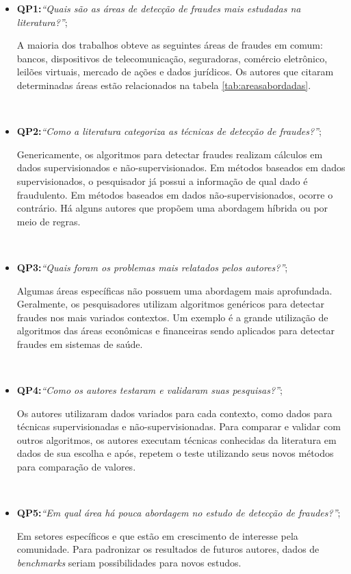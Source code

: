 \documentclass[smallextended]{svjour3}
\begin{document}
\begin{itemize}
	\item \textbf{QP1:}\textit{“Quais são as áreas de detecção de fraudes mais estudadas na literatura?”};
	
	A maioria dos trabalhos obteve as seguintes áreas de fraudes em comum: bancos, dispositivos de telecomunicação, seguradoras, comércio eletrônico, leilões virtuais, mercado de ações e dados jurídicos. Os autores que citaram determinadas áreas estão relacionados na tabela \ref{tab:areasabordadas}.
	
	\
	\item \textbf{QP2:}\textit{“Como a literatura categoriza as técnicas de detecção de fraudes?”};
	
	Genericamente, os algoritmos para detectar fraudes realizam cálculos em dados supervisionados e não-supervisionados. Em métodos baseados em dados supervisionados, o pesquisador já possui a informação de qual dado é fraudulento. Em métodos baseados em dados não-supervisionados, ocorre o contrário. Há alguns autores que propõem uma abordagem híbrida ou por meio de regras.
	
	\
	\item \textbf{QP3:}\textit{“Quais foram os problemas mais relatados pelos autores?”};
	
	Algumas áreas específicas não possuem uma abordagem mais aprofundada. Geralmente, os pesquisadores utilizam algoritmos genéricos para detectar fraudes nos mais variados contextos. Um exemplo é a grande utilização de algoritmos das áreas econômicas e financeiras sendo aplicados para detectar fraudes em sistemas de saúde.
	
	\
	\item \textbf{QP4:}\textit{“Como os autores testaram e validaram suas pesquisas?”};
	
	Os autores utilizaram dados variados para cada contexto, como dados para técnicas supervisionadas e não-supervisionadas. Para comparar e validar com outros algoritmos, os autores executam técnicas conhecidas da literatura em dados de sua escolha e após, repetem o teste utilizando seus novos métodos para comparação de valores.
	
	\
	\item \textbf{QP5:}\textit{“Em qual área há pouca abordagem no estudo de detecção de fraudes?”};
	
	Em setores específicos e que estão em crescimento de interesse pela comunidade. Para padronizar os resultados de futuros autores, dados de \emph{benchmarks} seriam possibilidades para novos estudos.
	

\end{itemize}
\end{document}
